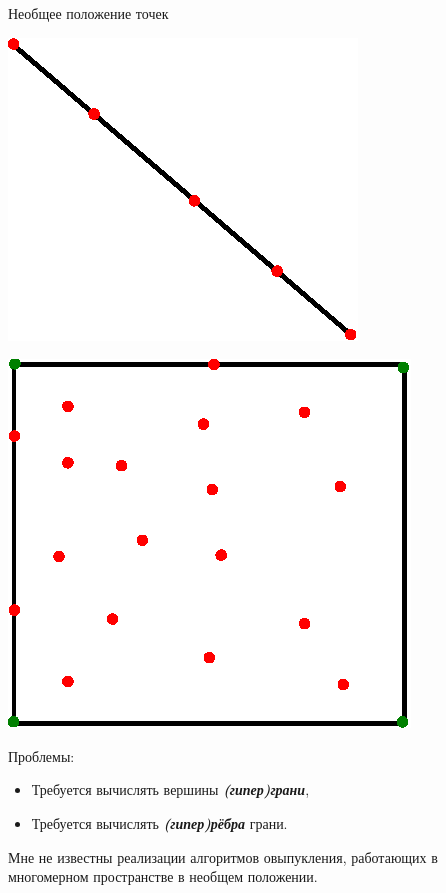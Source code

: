 \documentclass[]{beamer} %
\begin{document}
\begin{frame}{Необщее положение точек}
     \begin{minipage}{.49\textwidth}
     \centering
     \includegraphics[width=0.8\linewidth]{line.eps}
   \end{minipage}
   \begin{minipage}{.49\textwidth}
     \centering
     \includegraphics[width=0.8\linewidth]{cube12.eps}
   \end{minipage}

   \bigskip

   Проблемы:
   \begin{itemize}
    \item  Требуется вычислять вершины \textbf{\textit{(гипер)грани}},
    \item  Требуется вычислять \textbf{\textit{(гипер)рёбра}} грани.
    \end{itemize}
   \vfill
   Мне не известны реализации алгоритмов овыпукления, работающих в многомерном пространстве в необщем положении.
 \end{frame}
\end{document}
